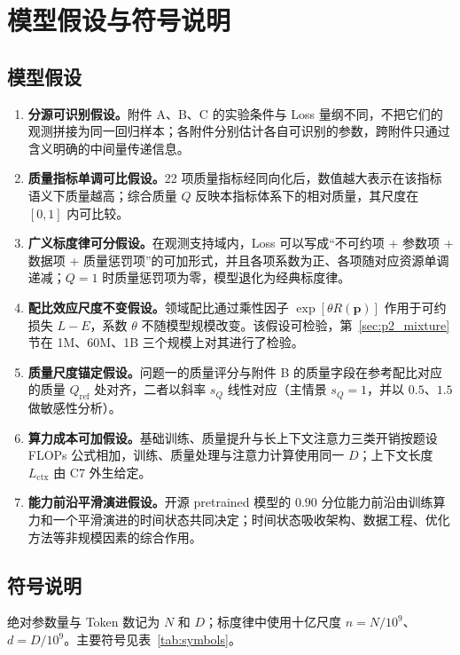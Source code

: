 \section{模型假设与符号说明}

\subsection{模型假设}

\begin{enumerate}
\item \textbf{分源可识别假设。}附件 A、B、C 的实验条件与 Loss 量纲不同，不把它们的观测拼接为同一回归样本；各附件分别估计各自可识别的参数，跨附件只通过含义明确的中间量传递信息。
\item \textbf{质量指标单调可比假设。}22 项质量指标经同向化后，数值越大表示在该指标语义下质量越高；综合质量 $Q$ 反映本指标体系下的相对质量，其尺度在 $[0,1]$ 内可比较。
\item \textbf{广义标度律可分假设。}在观测支持域内，Loss 可以写成“不可约项 + 参数项 + 数据项 + 质量惩罚项”的可加形式，并且各项系数为正、各项随对应资源单调递减；$Q=1$ 时质量惩罚项为零，模型退化为经典标度律。
\item \textbf{配比效应尺度不变假设。}领域配比通过乘性因子 $\exp[\theta R(\boldsymbol p)]$ 作用于可约损失 $L-E$，系数 $\theta$ 不随模型规模改变。该假设可检验，第~\ref{sec:p2_mixture}节在 1M、60M、1B 三个规模上对其进行了检验。
\item \textbf{质量尺度锚定假设。}问题一的质量评分与附件 B 的质量字段在参考配比对应的质量 $Q_{\mathrm{ref}}$ 处对齐，二者以斜率 $s_Q$ 线性对应（主情景 $s_Q=1$，并以 $0.5$、$1.5$ 做敏感性分析）。
\item \textbf{算力成本可加假设。}基础训练、质量提升与长上下文注意力三类开销按题设 FLOPs 公式相加，训练、质量处理与注意力计算使用同一 $D$；上下文长度 $L_{\mathrm{ctx}}$ 由 C7 外生给定。
\item \textbf{能力前沿平滑演进假设。}开源 pretrained 模型的 $0.90$ 分位能力前沿由训练算力和一个平滑演进的时间状态共同决定；时间状态吸收架构、数据工程、优化方法等非规模因素的综合作用。
\end{enumerate}

\subsection{符号说明}

绝对参数量与 Token 数记为 $N$ 和 $D$；标度律中使用十亿尺度 $n=N/10^9$、$d=D/10^9$。主要符号见表~\ref{tab:symbols}。

